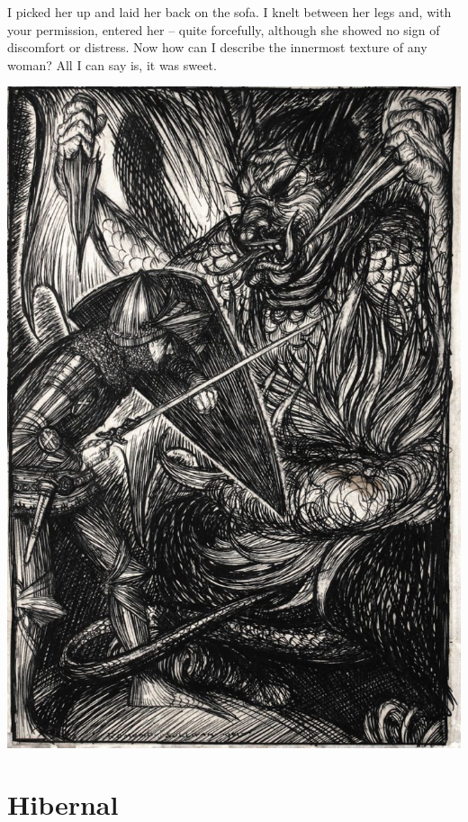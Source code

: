 \documentclass{amsbook}
\begin{document}
I picked her up and laid her back on the sofa. I knelt between her legs and, with your permission, entered her -- quite forcefully, although she showed no sign of discomfort or distress. Now how can I describe the innermost texture of any woman? All I can say is, it was sweet.

\clearpage

\thispagestyle{empty}
\vspace*{\fill}
{\centering
\includegraphics[width=\textwidth]{images/placeholder_image.jpg}}
\vspace*{\fill}
\clearpage

\chapter{Hibernal}
\end{document}
